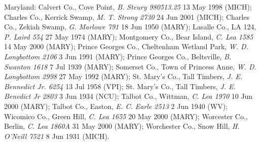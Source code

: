 \documentclass{article}
\begin{document}
Maryland:
Calvert Co., Cove Point, \textit{B. Steury 980513.25} 13 May 1998 (MICH);
Charles Co., Kerrick Swamp, \textit{M. T. Strong 2730} 24 Jun 2001 (MICH);
Charles Co., Zekiah Swamp, \textit{G. Marlowe 791} 18 Jun 1950 (MARY);
Lasalle Co., LA 124, \textit{P. Laird 554} 27 May 1974 (MARY);
Montgomery Co., Bear Island, \textit{C. Lea 1585} 14 May 2000 (MARY);
Prince Georges Co., Cheltenham Wetland Park, \textit{W. D. Longbottom 2106} 3 Jun 1991 (MARY);
Prince Georges Co., Beltsville, \textit{B. Swanton 1618} 7 Jul 1939 (MARY);
Somerset Co., Town of Princess Anne, \textit{W. D. Longbottom 2998} 27 May 1992 (MARY);
St. Mary's Co., Tall Timbers, \textit{J. E. Bennedict Jr. 6254} 13 Jul 1958 (VPI);
St. Mary's Co., Tall Timbers, \textit{J. E. Benedict Jr 2803} 3 Jun 1934 (NCU);
Talbot Co., Wittman, \textit{C. Lea 1970} 10 Jun 2000 (MARY);
Talbot Co., Easton, \textit{E. C. Earle 2513} 2 Jun 1940 (WV);
Wicomico Co., Green Hill, \textit{C. Lea 1655} 20 May 2000 (MARY);
Worcester Co., Berlin, \textit{C. Lea 1860A} 31 May 2000 (MARY);
Worchester Co., Snow Hill, \textit{H. O'Neill 7521} 8 Jun 1931 (MICH).
\end{document}
